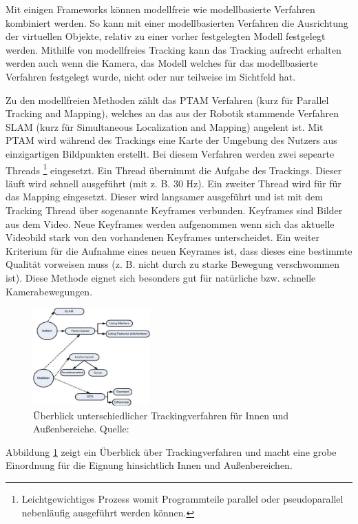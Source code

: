 Mit einigen Frameworks können modellfreie wie modellbasierte Verfahren kombiniert werden. So kann mit einer modellbasierten Verfahren die Ausrichtung der virtuellen Objekte, relativ zu einer vorher festgelegten Modell festgelegt werden. Mithilfe von modellfreies Tracking kann das Tracking aufrecht erhalten werden auch wenn die Kamera, das Modell welches für das modellbasierte Verfahren festgelegt wurde, nicht oder nur teilweise im Sichtfeld hat. 

Zu den modellfreien Methoden zählt das PTAM Verfahren (kurz für  Parallel Tracking and Mapping), welches an das aus der Robotik stammende Verfahren SLAM (kurz für Simultaneous Localization and Mapping) angelent ist. \cite{Klein2007} Mit PTAM wird während des Trackings eine Karte der Umgebung des Nutzers aus einzigartigen Bildpunkten erstellt. Bei diesem Verfahren werden zwei sepearte Threads \footnote{Leichtgewichtiges Prozess womit Programmteile parallel oder pseudoparallel nebenläufig ausgeführt werden können.} eingesetzt. Ein Thread übernimmt die Aufgabe des Trackings. Dieser läuft wird schnell ausgeführt (mit z. B. 30 Hz). Ein zweiter Thread wird für für das Mapping eingesetzt. Dieser wird langsamer ausgeführt und ist mit dem Tracking Thread über sogenannte Keyframes verbunden. Keyframes sind Bilder aus dem Video. Neue Keyframes werden aufgenommen wenn sich das aktuelle Videobild stark von den vorhandenen Keyframes unterscheidet. Ein weiter Kriterium für die Aufnahme eines neuen Keyrames ist, dass dieses eine bestimmte Qualität vorweisen muss (z. B. nicht durch zu starke Bewegung verschwommen ist). Diese Methode eignet sich besonders gut für natürliche bzw. schnelle Kamerabewegungen.

\begin{figure}[H]
	\centering
	\includegraphics[width=0.4\textwidth]{resources/fundamentals/tracking_technicken.png}
	\caption{Überblick unterschiedlicher Trackingverfahren für Innen und Außenbereiche. Quelle: \cite{Arora2017}}
	\label{img:overviewTrackingMethods}
\end{figure}

Abbildung \ref{img:overviewTrackingMethods} zeigt ein Überblick über Trackingverfahren und macht eine grobe Einordnung für die Eignung hinsichtlich Innen und Außenbereichen.


